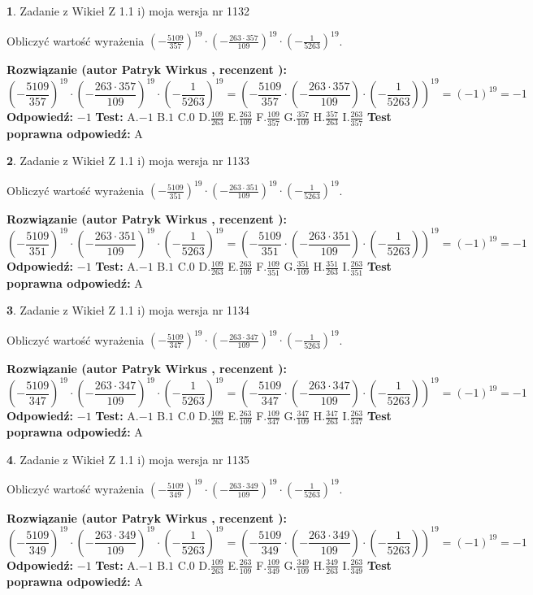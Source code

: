 \documentclass[12pt, a4paper]{article}
\theoremstyle{definition} %
\newtheorem{zad}{}
\newcommand{\zadStart}[1]{\begin{zad}#1\newline}
\newcommand{\zadStop}{\end{zad}}
\newcommand{\rozwStart}[2]{\noindent \textbf{Rozwiązanie (autor #1 , recenzent #2): }\newline}
\newcommand{\rozwStop}{\newline}
\newcommand{\odpStart}{\noindent \textbf{Odpowiedź:}\newline}
\newcommand{\odpStop}{\newline}
\newcommand{\testStart}{\noindent \textbf{Test:}\newline}
\newcommand{\testStop}{\newline}
\newcommand{\kluczStart}{\noindent \textbf{Test poprawna odpowiedź:}\newline}
\newcommand{\kluczStop}{\newline}
\begin{document}
\zadStart{Zadanie z Wikieł Z 1.1 i) moja wersja nr 1132}

Obliczyć wartość wyrażenia $(-\frac{5109}{357})^{19} \cdot (-\frac{263 \cdot 357}{109})^{19} \cdot (-\frac{1}{5263})^{19}$.
\zadStop
\rozwStart{Patryk Wirkus}{}
$$(-\frac{5109}{357})^{19} \cdot (-\frac{263 \cdot 357}{109})^{19} \cdot (-\frac{1}{5263})^{19} = (-\frac{5109}{357} \cdot (-\frac{263 \cdot 357}{109}) \cdot (-\frac{1}{5263}))^{19} = (-1)^{19} = -1$$
\rozwStop
\odpStart
$-1$
\odpStop
\testStart
A.$-1$ B.$1$ C.$0$ D.$\frac{109}{263}$ E.$\frac{263}{109}$
F.$\frac{109}{357}$ G.$\frac{357}{109}$
H.$\frac{357}{263}$
I.$\frac{263}{357}$
\testStop
\kluczStart
A
\kluczStop



\zadStart{Zadanie z Wikieł Z 1.1 i) moja wersja nr 1133}

Obliczyć wartość wyrażenia $(-\frac{5109}{351})^{19} \cdot (-\frac{263 \cdot 351}{109})^{19} \cdot (-\frac{1}{5263})^{19}$.
\zadStop
\rozwStart{Patryk Wirkus}{}
$$(-\frac{5109}{351})^{19} \cdot (-\frac{263 \cdot 351}{109})^{19} \cdot (-\frac{1}{5263})^{19} = (-\frac{5109}{351} \cdot (-\frac{263 \cdot 351}{109}) \cdot (-\frac{1}{5263}))^{19} = (-1)^{19} = -1$$
\rozwStop
\odpStart
$-1$
\odpStop
\testStart
A.$-1$ B.$1$ C.$0$ D.$\frac{109}{263}$ E.$\frac{263}{109}$
F.$\frac{109}{351}$ G.$\frac{351}{109}$
H.$\frac{351}{263}$
I.$\frac{263}{351}$
\testStop
\kluczStart
A
\kluczStop



\zadStart{Zadanie z Wikieł Z 1.1 i) moja wersja nr 1134}

Obliczyć wartość wyrażenia $(-\frac{5109}{347})^{19} \cdot (-\frac{263 \cdot 347}{109})^{19} \cdot (-\frac{1}{5263})^{19}$.
\zadStop
\rozwStart{Patryk Wirkus}{}
$$(-\frac{5109}{347})^{19} \cdot (-\frac{263 \cdot 347}{109})^{19} \cdot (-\frac{1}{5263})^{19} = (-\frac{5109}{347} \cdot (-\frac{263 \cdot 347}{109}) \cdot (-\frac{1}{5263}))^{19} = (-1)^{19} = -1$$
\rozwStop
\odpStart
$-1$
\odpStop
\testStart
A.$-1$ B.$1$ C.$0$ D.$\frac{109}{263}$ E.$\frac{263}{109}$
F.$\frac{109}{347}$ G.$\frac{347}{109}$
H.$\frac{347}{263}$
I.$\frac{263}{347}$
\testStop
\kluczStart
A
\kluczStop



\zadStart{Zadanie z Wikieł Z 1.1 i) moja wersja nr 1135}

Obliczyć wartość wyrażenia $(-\frac{5109}{349})^{19} \cdot (-\frac{263 \cdot 349}{109})^{19} \cdot (-\frac{1}{5263})^{19}$.
\zadStop
\rozwStart{Patryk Wirkus}{}
$$(-\frac{5109}{349})^{19} \cdot (-\frac{263 \cdot 349}{109})^{19} \cdot (-\frac{1}{5263})^{19} = (-\frac{5109}{349} \cdot (-\frac{263 \cdot 349}{109}) \cdot (-\frac{1}{5263}))^{19} = (-1)^{19} = -1$$
\rozwStop
\odpStart
$-1$
\odpStop
\testStart
A.$-1$ B.$1$ C.$0$ D.$\frac{109}{263}$ E.$\frac{263}{109}$
F.$\frac{109}{349}$ G.$\frac{349}{109}$
H.$\frac{349}{263}$
I.$\frac{263}{349}$
\testStop
\kluczStart
A
\kluczStop
\end{document}
